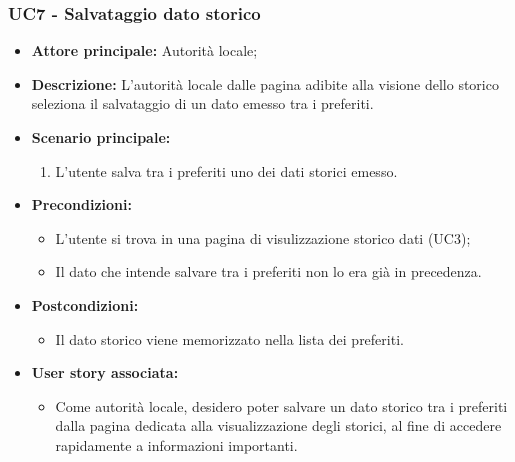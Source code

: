 \subsubsection{UC7 - Salvataggio dato storico}
\begin{itemize}
    \item \textbf{Attore principale:} Autorità locale;
    \item \textbf{Descrizione:} L’autorità locale dalle pagina adibite alla visione dello storico seleziona il salvataggio di un dato emesso tra i preferiti.
    \item \textbf{Scenario principale:}
          \begin{enumerate}
              \item L'utente salva tra i preferiti uno dei dati storici emesso.
          \end{enumerate}
    \item \textbf{Precondizioni:}
          \begin{itemize}
              \item  L'utente si trova in una pagina di visulizzazione storico dati (UC3);
              \item  Il dato che intende salvare tra i preferiti non lo era già in precedenza.
          \end{itemize}
    \item \textbf{Postcondizioni:}
          \begin{itemize}
              \item  Il dato storico viene memorizzato nella lista dei preferiti.
          \end{itemize}
    \item \textbf{User story associata:}
          \begin{itemize}
              \item Come autorità locale, desidero poter salvare un dato storico tra i preferiti dalla pagina dedicata alla visualizzazione degli storici, al fine di accedere rapidamente a informazioni importanti.
          \end{itemize}
\end{itemize}
